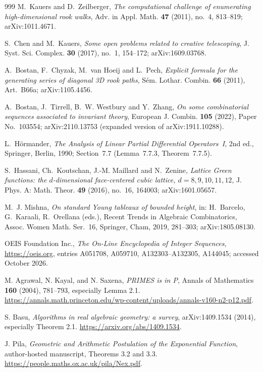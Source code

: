 \documentclass[11pt,a4paper]{article}
\theoremstyle{definition}
\theoremstyle{remark}
\numberwithin{equation}{section}
\begin{document}
\begin{thebibliography}{999}
M.~Kauers and D.~Zeilberger, \emph{The computational challenge of
enumerating high-dimensional rook walks}, Adv. in Appl. Math. \textbf{47}
(2011), no.~4, 813--819; arXiv:1011.4671.

S.~Chen and M.~Kauers, \emph{Some open problems related to creative
telescoping}, J. Syst. Sci. Complex. \textbf{30} (2017), no.~1, 154--172;
arXiv:1609.03768.

A.~Bostan, F.~Chyzak, M.~van Hoeij and L.~Pech, \emph{Explicit formula for
the generating series of diagonal 3D rook paths}, S\'em. Lothar. Combin.
\textbf{66} (2011), Art.~B66a; arXiv:1105.4456.

A.~Bostan, J.~Tirrell, B.~W. Westbury and Y.~Zhang, \emph{On some
combinatorial sequences associated to invariant theory}, European J.
Combin. \textbf{105} (2022), Paper No.~103554; arXiv:2110.13753 (expanded
version of arXiv:1911.10288).

L.~H\"ormander, \emph{The Analysis of Linear Partial Differential
Operators~I}, 2nd ed., Springer, Berlin, 1990; Section~7.7 (Lemma~7.7.3,
Theorem~7.7.5).

S.~Hassani, Ch.~Koutschan, J.-M. Maillard and N.~Zenine, \emph{Lattice
Green functions: the $d$-dimensional face-centered cubic lattice,
$d=8,9,10,11,12$}, J. Phys. A: Math. Theor. \textbf{49} (2016), no.~16,
164003; arXiv:1601.05657.

M.~J. Mishna, \emph{On standard Young tableaux of bounded height}, in:
H.~Barcelo, G.~Karaali, R.~Orellana (eds.), Recent Trends in Algebraic
Combinatorics, Assoc. Women Math. Ser.~16, Springer, Cham, 2019, 281--303;
arXiv:1805.08130.

OEIS Foundation Inc., \emph{The On-Line Encyclopedia of Integer Sequences},
\url{https://oeis.org}, entries A051708, A059710, A132303--A132305,
A144045; accessed October 2026.

M. Agrawal, N. Kayal, and N. Saxena,
\emph{PRIMES is in P}, Annals of Mathematics \textbf{160} (2004),
781--793, especially Lemma 2.1.
\url{https://annals.math.princeton.edu/wp-content/uploads/annals-v160-n2-p12.pdf}.

S. Basu, \emph{Algorithms in real algebraic geometry: a survey},
arXiv:1409.1534 (2014), especially Theorem 2.1.
\url{https://arxiv.org/abs/1409.1534}.

J. Pila, \emph{Geometric and Arithmetic Postulation of the Exponential
Function}, author-hosted manuscript, Theorems 3.2 and 3.3.
\url{https://people.maths.ox.ac.uk/pila/Nex.pdf}.


\end{thebibliography}
\end{document}
